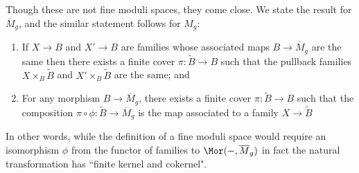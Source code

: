 Though these are not fine moduli spaces, they come close. We state the result for $\overline M_g$, and the similar statement follows for $M_g$:

\begin{fact}
\begin{enumerate}
\item If $X \to B$ and $X' \to B$ are families whose associated maps $B \to \overline M_g$ are the same then there exists a finite cover $\pi : \tilde B \to B$ such that the pullback families $X \times_B \tilde B$ and $X' \times_B \tilde B$ are the same; and
\item For any morphism $B \to \overline M_g$, there exists a finite cover $\pi : \tilde B \to B$ such that the composition $\pi \circ \phi : \tilde B \to \overline M_g$ is the map associated to a family $X \to \tilde B$
\end{enumerate}
\end{fact}

In other words, while the definition of a fine moduli space would require an isomorphism $\phi$ from the functor of families
to $\Mor(-, \overline M_g)$ in fact the natural transformation has ``finite kernel and cokernel".



%
%


